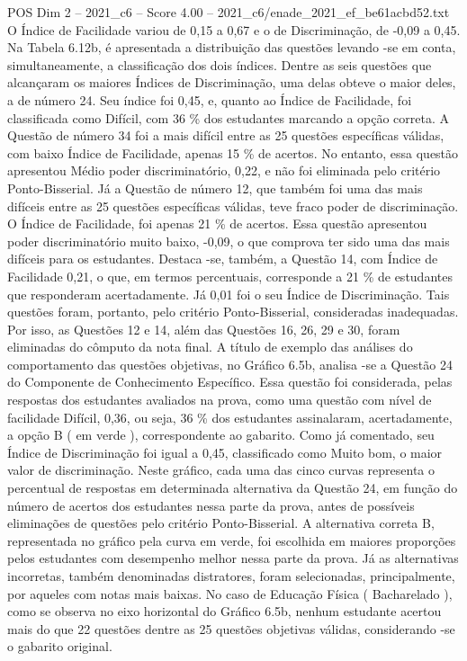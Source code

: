 \begin{textsample}{POS Dim 2 – 2021\_c6 – Score 4.00 – 2021\_c6/enade\_2021\_ef\_be61acbd52.txt}
O Índice de Facilidade variou de 0,15 a 0,67 e o de Discriminação, de -0,09 a 0,45.
Na Tabela 6.12b, é apresentada a distribuição das questões levando -se em conta, simultaneamente, a classificação dos dois índices.
Dentre as seis questões que alcançaram os maiores Índices de Discriminação, uma delas obteve o maior deles, a de número 24.
Seu índice foi 0,45, e, quanto ao Índice de Facilidade, foi classificada como Difícil, com 36 \% dos estudantes marcando a opção correta.
A Questão de número 34 foi a mais difícil entre as 25 questões específicas válidas, com baixo Índice de Facilidade, apenas 15 \% de acertos.
No entanto, essa questão apresentou Médio poder discriminatório, 0,22, e não foi eliminada pelo critério Ponto-Bisserial.
Já a Questão de número 12, que também foi uma das mais difíceis entre as 25 questões específicas válidas, teve fraco poder de discriminação.
O Índice de Facilidade, foi apenas 21 \% de acertos.
Essa questão apresentou poder discriminatório muito baixo, -0,09, o que comprova ter sido uma das mais difíceis para os estudantes.
Destaca -se, também, a Questão 14, com Índice de Facilidade 0,21, o que, em termos percentuais, corresponde a 21 \% de estudantes que responderam acertadamente.
Já 0,01 foi o seu Índice de Discriminação.
Tais questões foram, portanto, pelo critério Ponto-Bisserial, consideradas inadequadas.
Por isso, as Questões 12 e 14, além das Questões 16, 26, 29 e 30, foram eliminadas do cômputo da nota final.
A título de exemplo das análises do comportamento das questões objetivas, no Gráfico 6.5b, analisa -se a Questão 24 do Componente de Conhecimento Específico.
Essa questão foi considerada, pelas respostas dos estudantes avaliados na prova, como uma questão com nível de facilidade Difícil, 0,36, ou seja, 36 \% dos estudantes assinalaram, acertadamente, a opção B ( em verde ), correspondente ao gabarito.
Como já comentado, seu Índice de Discriminação foi igual a 0,45, classificado como Muito bom, o maior valor de discriminação.
Neste gráfico, cada uma das cinco curvas representa o percentual de respostas em determinada alternativa da Questão 24, em função do número de acertos dos estudantes nessa parte da prova, antes de possíveis eliminações de questões pelo critério Ponto-Bisserial.
A alternativa correta B, representada no gráfico pela curva em verde, foi escolhida em maiores proporções pelos estudantes com desempenho melhor nessa parte da prova.
Já as alternativas incorretas, também denominadas distratores, foram selecionadas, principalmente, por aqueles com notas mais baixas.
No caso de Educação Física ( Bacharelado ), como se observa no eixo horizontal do Gráfico 6.5b, nenhum estudante acertou mais do que 22 questões dentre as 25 questões objetivas válidas, considerando -se o gabarito original.

\end{textsample}

